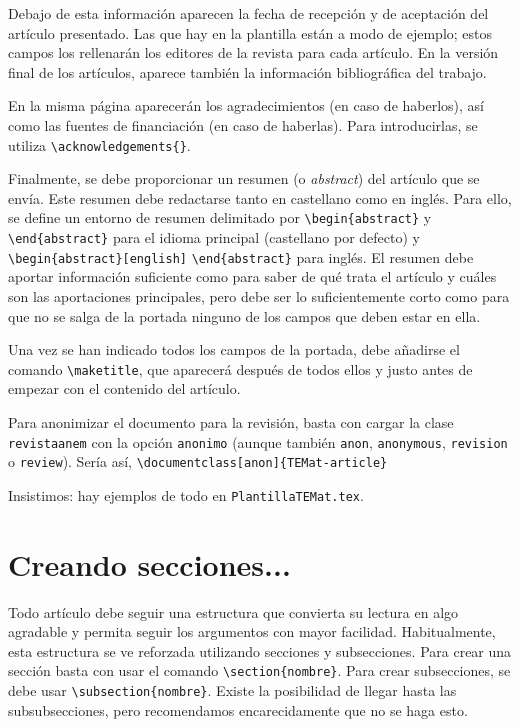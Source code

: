 \documentclass[bibtex, anon]{TEMat-article}
\begin{document}
Debajo de esta información aparecen la fecha de recepción y de aceptación del artículo presentado.
Las que hay en la plantilla están a modo de ejemplo; estos campos los rellenarán los editores de la revista para cada artículo.
En la versión final de los artículos, aparece también la información bibliográfica del trabajo.

En la misma página aparecerán los agradecimientos (en caso de haberlos), así como las fuentes de financiación (en caso de haberlas).
Para introducirlas, se utiliza \verb+\acknowledgements{}+.

Finalmente, se debe proporcionar un resumen (o \textit{abstract}) del artículo que se envía. Este resumen debe redactarse tanto en castellano como en inglés.
Para ello, se define un entorno de resumen delimitado por \verb+\begin{abstract}+ y \verb+\end{abstract}+ para el idioma principal (castellano por defecto) y \verb+\begin{abstract}[english]+ \verb+\end{abstract}+ para inglés.
El resumen debe aportar información suficiente como para saber de qué trata el artículo y cuáles son las aportaciones principales, pero debe ser lo suficientemente corto como para que no se salga de la portada ninguno de los campos que deben estar en ella.

Una vez se han indicado todos los campos de la portada, debe añadirse el comando \verb+\maketitle+, que aparecerá después de todos ellos y justo antes de empezar con el contenido del artículo.

Para anonimizar el documento para la revisión, basta con cargar la clase \verb+revistaanem+ con la opción \verb+anonimo+ (aunque también \verb+anon+, \verb+anonymous+, \verb+revision+ o \verb+review+).
Sería así, \verb+\documentclass[anon]{TEMat-article}+

Insistimos: hay ejemplos de todo en \verb+PlantillaTEMat.tex+.



\section{Creando secciones...}

Todo artículo debe seguir una estructura que convierta su lectura en algo agradable y permita seguir los argumentos con mayor facilidad.
Habitualmente, esta estructura se ve reforzada utilizando secciones y subsecciones.
Para crear una sección basta con usar el comando \verb+\section{nombre}+.
Para crear subsecciones, se debe usar \verb+\subsection{nombre}+.
Existe la posibilidad de llegar hasta las subsubsecciones, pero recomendamos encarecidamente que no se haga esto.
\end{document}

